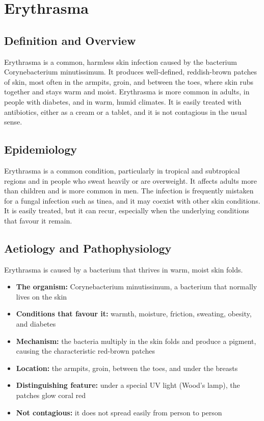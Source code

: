\chapter{Erythrasma}

\section*{Definition and Overview}
Erythrasma is a common, harmless skin infection caused by the bacterium Corynebacterium minutissimum. It produces well-defined, reddish-brown patches of skin, most often in the armpits, groin, and between the toes, where skin rubs together and stays warm and moist. Erythrasma is more common in adults, in people with diabetes, and in warm, humid climates. It is easily treated with antibiotics, either as a cream or a tablet, and it is not contagious in the usual sense.

\section*{Epidemiology}
Erythrasma is a common condition, particularly in tropical and subtropical regions and in people who sweat heavily or are overweight. It affects adults more than children and is more common in men. The infection is frequently mistaken for a fungal infection such as tinea, and it may coexist with other skin conditions. It is easily treated, but it can recur, especially when the underlying conditions that favour it remain.

\section*{Aetiology and Pathophysiology}
Erythrasma is caused by a bacterium that thrives in warm, moist skin folds.
\begin{itemize}
    \item \textbf{The organism:} Corynebacterium minutissimum, a bacterium that normally lives on the skin
    \item \textbf{Conditions that favour it:} warmth, moisture, friction, sweating, obesity, and diabetes
    \item \textbf{Mechanism:} the bacteria multiply in the skin folds and produce a pigment, causing the characteristic red-brown patches
    \item \textbf{Location:} the armpits, groin, between the toes, and under the breasts
    \item \textbf{Distinguishing feature:} under a special UV light (Wood's lamp), the patches glow coral red
    \item \textbf{Not contagious:} it does not spread easily from person to person
\end{itemize}

